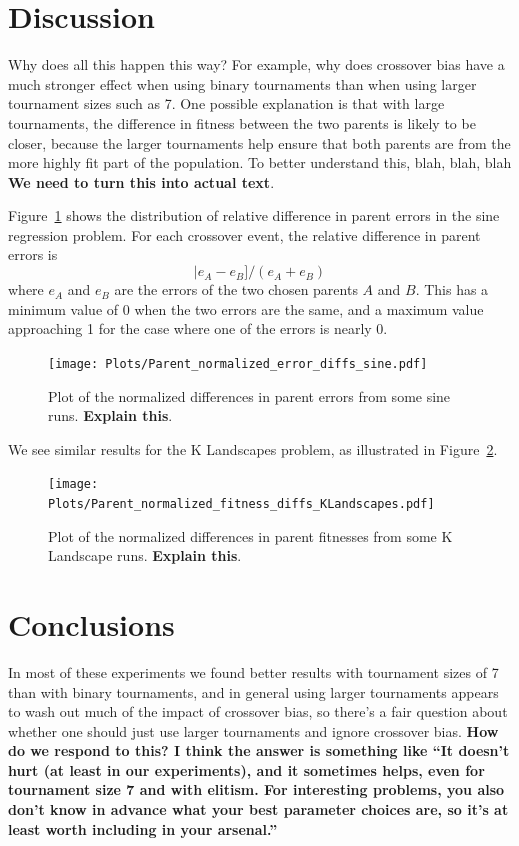 \documentclass{sig-alternate}
\begin{document}
\section{Discussion} \label{sec:Discussion}

Why does all this happen this way? For example, why does crossover bias have a much stronger effect when using binary
tournaments than when using larger tournament sizes such as 7. One possible explanation is that with large tournaments,
the difference in fitness between the two parents is likely to be closer, because the larger tournaments help ensure
that both parents are from the more highly fit part of the population. To better understand this, blah, blah, blah
\textbf{We need to turn this into actual text}.

Figure~\ref{fig:parentDiffsSine} shows the distribution of relative difference in parent errors in the sine regression 
problem. For each crossover event, the relative difference in parent errors is
\[
	|e_A - e_B] / (e_A + e_B)
\]
where $e_A$ and $e_B$ are the errors of the two chosen parents $A$ and $B$. This has a minimum value of 0 when 
the two errors are the same, and a maximum value approaching 1 for the case where one of the errors is nearly 0.

\begin{figure}
\centering
\texttt{[image: Plots/Parent\_normalized\_error\_diffs\_sine.pdf]}
\caption{Plot of the normalized differences in parent errors from some sine runs. \textbf{Explain this}.}
\label{fig:parentDiffsSine}
\end{figure}

We see similar results for the K Landscapes problem, as illustrated in Figure~\ref{fig:parentDiffsKLandscapes}.

\begin{figure}
\centering
\texttt{[image: Plots/Parent\_normalized\_fitness\_diffs\_KLandscapes.pdf]}
\caption{Plot of the normalized differences in parent fitnesses from some K Landscape runs. \textbf{Explain this}.}
\label{fig:parentDiffsKLandscapes}
\end{figure}

\section{Conclusions} \label{sec:Conclusions}

In most of these experiments we found better results with tournament sizes of 7 than with binary tournaments, and in 
general using larger tournaments appears to wash out much of the impact of crossover bias, so there's a fair question 
about whether one should just use larger tournaments and ignore crossover bias. \textbf{How do we respond to this? I 
think the answer is something like ``It doesn't hurt (at least in our experiments), and it sometimes helps, even for 
tournament size 7 and with elitism. For interesting problems, you also don't know in advance what your best parameter 
choices are, so it's at least worth including in your arsenal.''}
\end{document}

